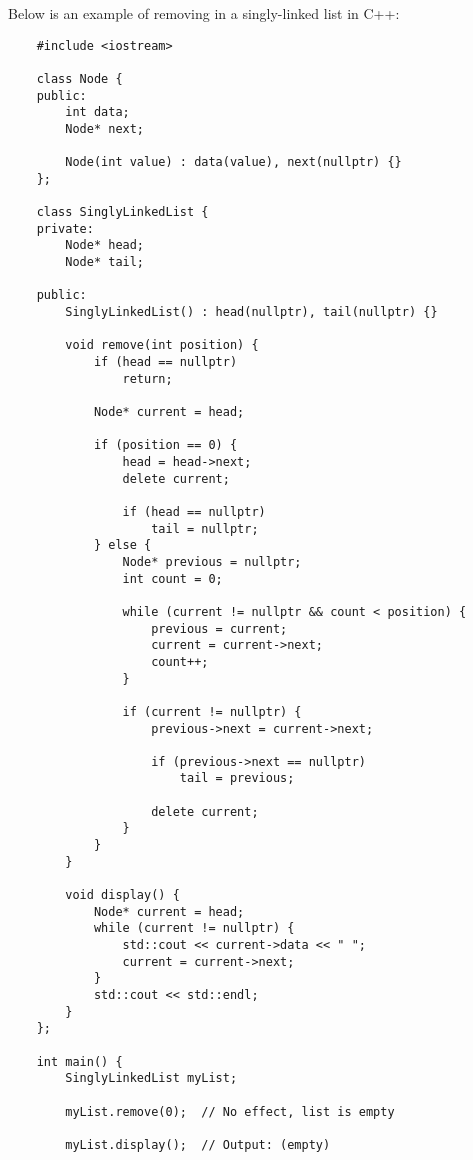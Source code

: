 \begin{solution}
    Below is an example of removing in a singly-linked list in C++:

    \horizontalline

    \begin{verbatim}
    #include <iostream>

    class Node {
    public:
        int data;
        Node* next;
    
        Node(int value) : data(value), next(nullptr) {}
    };
    
    class SinglyLinkedList {
    private:
        Node* head;
        Node* tail;
    
    public:
        SinglyLinkedList() : head(nullptr), tail(nullptr) {}
    
        void remove(int position) {
            if (head == nullptr)
                return;
    
            Node* current = head;
    
            if (position == 0) {
                head = head->next;
                delete current;
    
                if (head == nullptr)
                    tail = nullptr;
            } else {
                Node* previous = nullptr;
                int count = 0;
    
                while (current != nullptr && count < position) {
                    previous = current;
                    current = current->next;
                    count++;
                }
    
                if (current != nullptr) {
                    previous->next = current->next;
    
                    if (previous->next == nullptr)
                        tail = previous;
    
                    delete current;
                }
            }
        }
    
        void display() {
            Node* current = head;
            while (current != nullptr) {
                std::cout << current->data << " ";
                current = current->next;
            }
            std::cout << std::endl;
        }
    };
    
    int main() {
        SinglyLinkedList myList;
    
        myList.remove(0);  // No effect, list is empty
    
        myList.display();  // Output: (empty)
    

\end{verbatim}
\end{solution}
